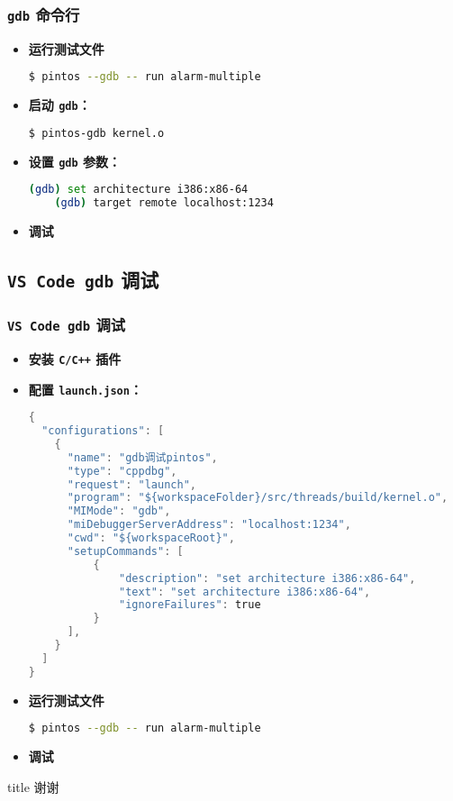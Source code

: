 \documentclass{beamer}
\begin{document}
\begin{frame}
  \frametitle{\texttt{gdb} 命令行}
  \begin{itemize}
    \item \textbf{运行测试文件}
          \begin{lstlisting}[language=bash]
    $ pintos --gdb -- run alarm-multiple
    \end{lstlisting}
    \item \textbf{启动 \texttt{gdb}：}
          \begin{lstlisting}[language=bash]
    $ pintos-gdb kernel.o
\end{lstlisting}
    \item \textbf{设置 \texttt{gdb} 参数：}
          \begin{lstlisting}[language=bash]
    (gdb) set architecture i386:x86-64
    (gdb) target remote localhost:1234
      \end{lstlisting}
    \item \textbf{调试}
  \end{itemize}

\end{frame}

\subsection{\texttt{VS Code gdb} 调试}
\begin{frame}
\frametitle{\texttt{VS Code gdb} 调试}
\begin{itemize}
  \item \textbf{安装 \texttt{C/C++} 插件}
  \item \textbf{配置 \texttt{launch.json}：}
  \begin{lstlisting}[language=C, numbers=none]
{
  "configurations": [
    {
      "name": "gdb调试pintos",
      "type": "cppdbg",
      "request": "launch",
      "program": "${workspaceFolder}/src/threads/build/kernel.o",
      "MIMode": "gdb",
      "miDebuggerServerAddress": "localhost:1234",
      "cwd": "${workspaceRoot}",
      "setupCommands": [
          {
              "description": "set architecture i386:x86-64",
              "text": "set architecture i386:x86-64",
              "ignoreFailures": true
          }
      ],
    }
  ]
}
  \end{lstlisting}
  \item \textbf{运行测试文件}
          \begin{lstlisting}[language=bash]
    $ pintos --gdb -- run alarm-multiple
    \end{lstlisting}
  \item \textbf{调试}
\end{itemize}

\end{frame}

\begin{frame}
  \vfill
  \centering
  \begin{beamercolorbox}[sep=8pt,center,shadow=true,rounded=true]{title}
    \LARGE{谢谢}\par%
  \end{beamercolorbox}
  \vfill
  \end{frame}
\end{document}
